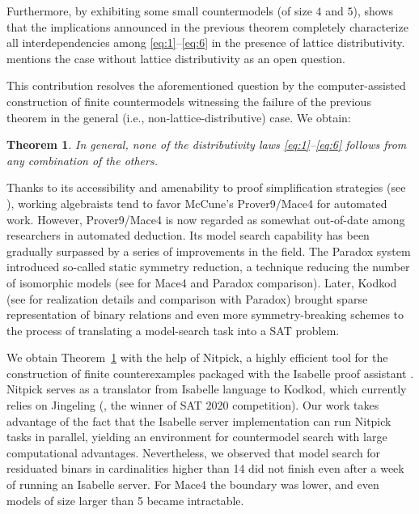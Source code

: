 \documentclass{easychair}
\newtheorem{theorem}{Theorem}
\begin{document}
Furthermore, by exhibiting some small countermodels (of size $4$ and $5$), \cite{FJ2019} shows that the implications announced in the previous theorem completely characterize all interdependencies among \eqref{eq:1}--\eqref{eq:6} in the presence of lattice distributivity. \cite{FJ2019} mentions the case without lattice distributivity as an open question.

This contribution resolves the aforementioned question by the computer-assisted construction of finite countermodels witnessing the failure of the previous theorem in the general (i.e., non-lattice-distributive) case. We obtain:
\begin{theorem}\label{thm:main}
In general, none of the distributivity laws \eqref{eq:1}--\eqref{eq:6} follows from any combination of the others.
\end{theorem}
Thanks to its accessibility and amenability to proof simplification strategies (see \cite{K2019}), working algebraists tend to favor McCune's {\sc Prover9/Mace4} \cite{prover9-mace4} for automated work. However, {\sc Prover9/Mace4} is now regarded as somewhat out-of-date among researchers in automated deduction. Its model search capability has been gradually surpassed by a series of improvements in the field. The Paradox \cite{Claessen2007NewTT} system introduced so-called static symmetry reduction, a technique reducing the number of isomorphic models (see \cite{Baumgartner07computingfinite} for {\sc Mace4} and Paradox comparison). Later, Kodkod (see \cite{Torlak07kodkod:a} for realization details and comparison with Paradox) brought sparse representation of binary relations and even more symmetry-breaking schemes to the process of translating a model-search task into a SAT problem.

We obtain Theorem~\ref{thm:main} with the help of Nitpick, a highly efficient tool for the construction of finite counterexamples packaged with the Isabelle proof assistant \cite{isabelle-system}. Nitpick serves as a translator from Isabelle language to Kodkod, which currently relies on Jingeling (\cite{Biere-SAT-Competition-2017-solvers}, the winner of SAT 2020 competition). Our work takes advantage of the fact that the Isabelle server implementation can run Nitpick tasks in parallel, yielding an environment for countermodel search with large computational advantages. Nevertheless, we observed that model search for residuated binars in cardinalities higher than 14 did not finish even after a week of running an Isabelle server. For {\sc Mace4} the boundary was lower, and even models of size larger than 5 became intractable.
\end{document}
